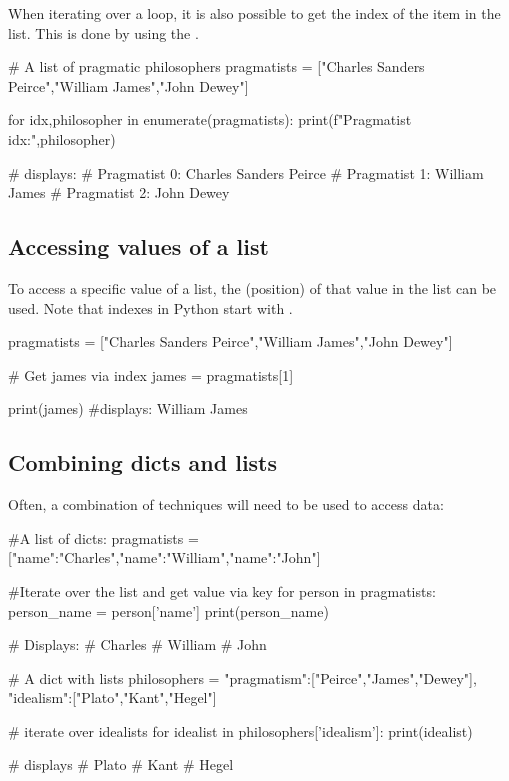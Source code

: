 When iterating over a loop, it is also possible to get the index of the item in the list. This is done by using the .

\begin{pycode}
    # A list of pragmatic philosophers
    pragmatists = ["Charles Sanders Peirce","William James","John Dewey"]

    for idx,philosopher in enumerate(pragmatists):
        print(f"Pragmatist {idx}:",philosopher)

    # displays:
    # Pragmatist 0: Charles Sanders Peirce
    # Pragmatist 1: William James
    # Pragmatist 2: John Dewey
\end{pycode}

\subsection{Accessing values of a list}

To access a specific value of a list, the  (position) of that value in the list can be used. Note that indexes in Python start with .

\begin{pycode}
    pragmatists = ["Charles Sanders Peirce","William James","John Dewey"]

    # Get james via index 
    james = pragmatists[1]

    print(james) #displays: William James
\end{pycode}

\subsection{Combining dicts and lists}

Often, a combination of techniques will need to be used to access data:

\begin{pycode}
    #A list of dicts:
    pragmatists = [{"name":"Charles"},{"name":"William"},{"name":"John"}]

    #Iterate over the list and get value via key
    for person in pragmatists:
        person_name = person['name']
        print(person_name)

    # Displays:
    # Charles
    # William
    # John
\end{pycode}

\begin{pycode}
    # A dict with lists
    philosophers = {
        "pragmatism":["Peirce","James","Dewey"],
        "idealism":["Plato","Kant","Hegel"]
    }

    # iterate over idealists
    for idealist in philosophers['idealism']:
        print(idealist)

    # displays
    # Plato
    # Kant
    # Hegel

\end{pycode}

